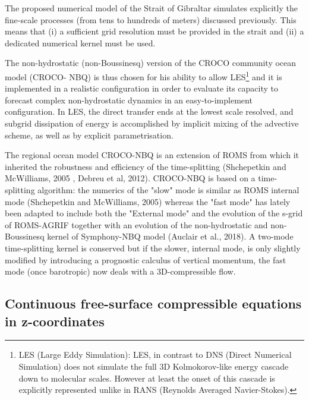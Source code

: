 \documentclass[a4paper,12pt]{article}
\begin{document}
The proposed numerical model of the Strait of Gibraltar simulates explicitly the fine-scale processes (from tens to hundreds of meters) discussed previously. This means that (i) a sufficient grid resolution must be provided in the strait and (ii) a dedicated numerical kernel must be used.

The non-hydrostatic (non-Boussinesq) version of the CROCO community ocean model (CROCO- NBQ) is thus chosen for his ability to allow LES\footnote{LES (Large Eddy Simulation): LES, in contrast to DNS (Direct Numerical Simulation) does not simulate the full 3D Kolmokorov-like energy cascade down to molecular scales. However at least the onset of this cascade is explicitly represented unlike in RANS (Reynolds Averaged Navier-Stokes).} and it is implemented in a realistic configuration in order to evaluate its capacity to forecast complex non-hydrostatic dynamics in an easy-to-implement configuration. In LES, the direct transfer ends at the lowest scale resolved, and subgrid dissipation of energy is accomplished by implicit mixing of the advective scheme, as well as by explicit parametrisation.

The regional ocean model CROCO-NBQ is an extension of ROMS from which it inherited the robustness and efficiency of the time-splitting (Shchepetkin and McWilliams, 2005 , Debreu et al, 2012). CROCO-NBQ is based on a time-splitting algorithm: the numerics of the "slow" mode is similar as ROMS internal mode (Shchepetkin and McWilliams, 2005) whereas the "fast mode" has lately been adapted to include both the "External mode" and the evolution of the s-grid of ROMS-AGRIF together with an evolution of the non-hydrostatic and non-Boussinesq kernel of Symphony-NBQ model (Auclair et al., 2018). A two-mode time-splitting kernel is conserved but if the slower, internal mode, is only slightly modified by introducing a prognostic calculus of vertical momentum, the fast mode (once barotropic) now deals with a 3D-compressible flow. \\

 \subsection{Continuous free-surface compressible equations in z-coordinates}
 \label{NavierStokes}
 
\end{document}
